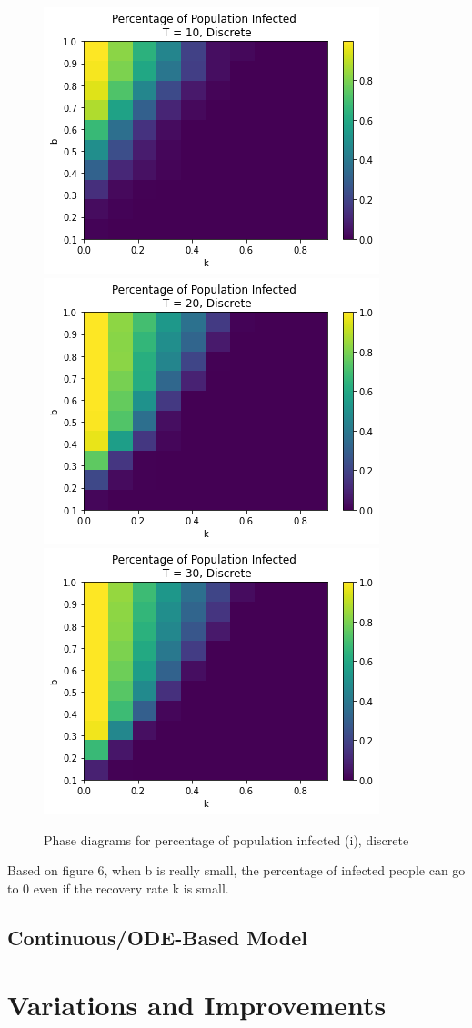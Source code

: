 \documentclass{article}
\begin{document}
\begin{figure}[htp]

\centering
\includegraphics[width=.3\textwidth]{Figure1_discrete_bsmall_infectT10.png}\hfill
\includegraphics[width=.3\textwidth]{Figure1_discrete_bsmall_infectT20.png}\hfill
\includegraphics[width=.3\textwidth]{Figure1_discrete_bsmall_infectT30.png}

\caption{Phase diagrams for percentage of population infected (i), discrete}
\label{fig:figure3}

\end{figure}

Based on figure 6, when b is really small, the percentage of infected people can go to 0 even if the recovery rate k is small.




\subsection{Continuous/ODE-Based Model}











\section{Variations and Improvements}
\end{document}
